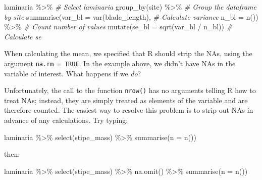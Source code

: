 \documentclass[
]{book}
\newenvironment{Shaded}{\begin{snugshade}}{\end{snugshade}}
\newcommand{\AttributeTok}[1]{\textcolor[rgb]{0.77,0.63,0.00}{#1}}
\newcommand{\CommentTok}[1]{\textcolor[rgb]{0.56,0.35,0.01}{\textit{#1}}}
\newcommand{\FunctionTok}[1]{\textcolor[rgb]{0.00,0.00,0.00}{#1}}
\newcommand{\NormalTok}[1]{#1}
\newcommand{\SpecialCharTok}[1]{\textcolor[rgb]{0.00,0.00,0.00}{#1}}
\begin{document}
\begin{Shaded}
\begin{Highlighting}[]
\NormalTok{laminaria }\SpecialCharTok{\%\textgreater{}\%} \CommentTok{\# Select \textquotesingle{}laminaria\textquotesingle{}}
  \FunctionTok{group\_by}\NormalTok{(site) }\SpecialCharTok{\%\textgreater{}\%} \CommentTok{\# Group the dataframe by site}
  \FunctionTok{summarise}\NormalTok{(}\AttributeTok{var\_bl =} \FunctionTok{var}\NormalTok{(blade\_length), }\CommentTok{\# Calculate variance}
            \AttributeTok{n\_bl =} \FunctionTok{n}\NormalTok{()) }\SpecialCharTok{\%\textgreater{}\%}  \CommentTok{\# Count number of values}
  \FunctionTok{mutate}\NormalTok{(}\AttributeTok{se\_bl =} \FunctionTok{sqrt}\NormalTok{(var\_bl }\SpecialCharTok{/}\NormalTok{ n\_bl)) }\CommentTok{\# Calculate se}
\end{Highlighting}
\end{Shaded}

When calculating the mean, we specified that R should strip the NAs, using the argument \texttt{na.rm\ =\ TRUE}. In the example above, we didn't have NAs in the variable of interest. What happens if we \emph{do}?

Unfortunately, the call to the function \texttt{nrow()} has no arguments telling R how to treat NAs; instead, they are simply treated as elements of the variable and are therefore counted. The easiest way to resolve this problem is to strip out NAs in advance of any calculations. Try typing:

\begin{Shaded}
\begin{Highlighting}[]
\NormalTok{laminaria }\SpecialCharTok{\%\textgreater{}\%} 
  \FunctionTok{select}\NormalTok{(stipe\_mass) }\SpecialCharTok{\%\textgreater{}\%} 
  \FunctionTok{summarise}\NormalTok{(}\AttributeTok{n =} \FunctionTok{n}\NormalTok{())}
\end{Highlighting}
\end{Shaded}

then:

\begin{Shaded}
\begin{Highlighting}[]
\NormalTok{laminaria }\SpecialCharTok{\%\textgreater{}\%} 
  \FunctionTok{select}\NormalTok{(stipe\_mass) }\SpecialCharTok{\%\textgreater{}\%} 
  \FunctionTok{na.omit}\NormalTok{() }\SpecialCharTok{\%\textgreater{}\%} 
  \FunctionTok{summarise}\NormalTok{(}\AttributeTok{n =} \FunctionTok{n}\NormalTok{())}
\end{Highlighting}
\end{Shaded}
\end{document}

